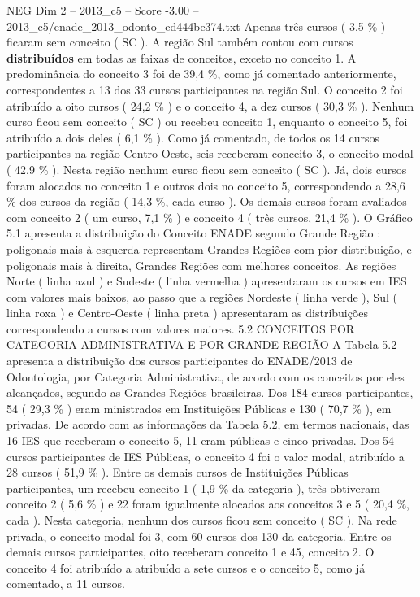 \begin{textsample}{NEG Dim 2 – 2013\_c5 – Score -3.00 – 2013\_c5/enade\_2013\_odonto\_ed444be374.txt}
Apenas três cursos ( 3,5 \% ) ficaram sem conceito ( SC ).
A região Sul também contou com cursos \textbf{distribuídos} em todas as faixas de conceitos, exceto no conceito 1.
A predominância do conceito 3 foi de 39,4 \%, como já comentado anteriormente, correspondentes a 13 dos 33 cursos participantes na região Sul.
O conceito 2 foi atribuído a oito cursos ( 24,2 \% ) e o conceito 4, a dez cursos ( 30,3 \% ).
Nenhum curso ficou sem conceito ( SC ) ou recebeu conceito 1, enquanto o conceito 5, foi atribuído a dois deles ( 6,1 \% ).
Como já comentado, de todos os 14 cursos participantes na região Centro-Oeste, seis receberam conceito 3, o conceito modal ( 42,9 \% ).
Nesta região nenhum curso ficou sem conceito ( SC ).
Já, dois cursos foram alocados no conceito 1 e outros dois no conceito 5, correspondendo a 28,6 \% dos cursos da região ( 14,3 \%, cada curso ).
Os demais cursos foram avaliados com conceito 2 ( um curso, 7,1 \% ) e conceito 4 ( três cursos, 21,4 \% ).
O Gráfico 5.1 apresenta a distribuição do Conceito ENADE segundo Grande Região : poligonais mais à esquerda representam Grandes Regiões com pior distribuição, e poligonais mais à direita, Grandes Regiões com melhores conceitos.
As regiões Norte ( linha azul ) e Sudeste ( linha vermelha ) apresentaram os cursos em IES com valores mais baixos, ao passo que a regiões Nordeste ( linha verde ), Sul ( linha roxa ) e Centro-Oeste ( linha preta ) apresentaram as distribuições correspondendo a cursos com valores maiores. 5.2 CONCEITOS POR CATEGORIA ADMINISTRATIVA E POR GRANDE REGIÃO A Tabela 5.2 apresenta a distribuição dos cursos participantes do ENADE/2013 de Odontologia, por Categoria Administrativa, de acordo com os conceitos por eles alcançados, segundo as Grandes Regiões brasileiras.
Dos 184 cursos participantes, 54 ( 29,3 \% ) eram ministrados em Instituições Públicas e 130 ( 70,7 \% ), em privadas.
De acordo com as informações da Tabela 5.2, em termos nacionais, das 16 IES que receberam o conceito 5, 11 eram públicas e cinco privadas.
Dos 54 cursos participantes de IES Públicas, o conceito 4 foi o valor modal, atribuído a 28 cursos ( 51,9 \% ).
Entre os demais cursos de Instituições Públicas participantes, um recebeu conceito 1 ( 1,9 \% da categoria ), três obtiveram conceito 2 ( 5,6 \% ) e 22 foram igualmente alocados aos conceitos 3 e 5 ( 20,4 \%, cada ).
Nesta categoria, nenhum dos cursos ficou sem conceito ( SC ).
Na rede privada, o conceito modal foi 3, com 60 cursos dos 130 da categoria.
Entre os demais cursos participantes, oito receberam conceito 1 e 45, conceito 2.
O conceito 4 foi atribuído a atribuído a sete cursos e o conceito 5, como já comentado, a 11 cursos.

\end{textsample}
